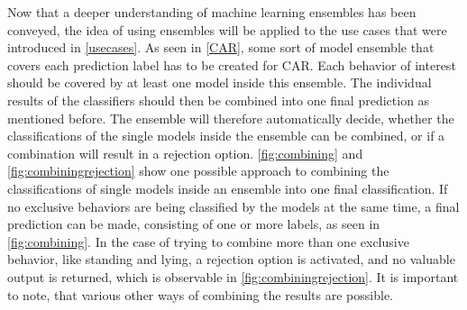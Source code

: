 Now that a deeper understanding of machine learning ensembles has been conveyed, the idea of using ensembles will be applied to the use cases that were introduced in \autoref{usecases}. As seen in \autoref{CAR}, some sort of model ensemble that covers each prediction label has to be created for CAR. Each behavior of interest should be covered by at least one model inside this ensemble. The individual results of the classifiers should then be combined into one final prediction as mentioned before. The ensemble will therefore automatically decide, whether the classifications of the single models inside the ensemble can be combined, or if a combination will result in a rejection option. \autoref{fig:combining} and \autoref{fig:combiningrejection} show one possible approach to combining the classifications of single models inside an ensemble into one final classification. If no exclusive behaviors are being classified by the models at the same time, a final prediction can be made, consisting of one or more labels, as seen in \autoref{fig:combining}. In the case of trying to combine more than one exclusive behavior, like standing and lying, a rejection option is activated, and no valuable output is returned, which is observable in \autoref{fig:combiningrejection}. It is important to note, that various other ways of combining the results are possible.



